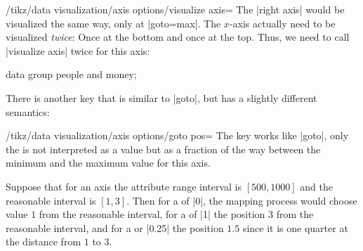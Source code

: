 \begin{key}{/tikz/data visualization/axis options/visualize axis=}
    The |right axis| would be visualized the same way, only at |goto=max|. The
    $x$-axis actually need to be visualized \emph{twice}: Once at the bottom
    and once at the top. Thus, we need to call |visualize axis| twice for this
    axis:
%
\begin{codeexample}[]
\tikz \datavisualization [
    our system,
    x axis={attribute=time, length=4cm},
    left axis ={attribute=money},
    right axis={attribute=people},
    visualize as line/.list={people 1, people 2, money 1, money 2}]
  data group {people and money};
\end{codeexample}

    There is another key that is similar to |goto|, but has a slightly
    different semantics:
    \begin{key}{/tikz/data visualization/axis options/goto pos=}
        The key works like |goto|, only the  is not interpreted
        as a value but as a fraction of the way between the minimum and the
        maximum value for this axis.

        Suppose that for an axis the attribute range interval is $[500,1000]$
        and the reasonable interval is $[1,3]$. Then for a  of
        |0|, the mapping process would choose value $1$ from the reasonable
        interval, for a  of |1| the position $3$ from the
        reasonable interval, and for a  or |0.25| the position
        $1.5$ since it is one quarter at the distance from $1$ to $3$.


\end{key}
\end{key}
